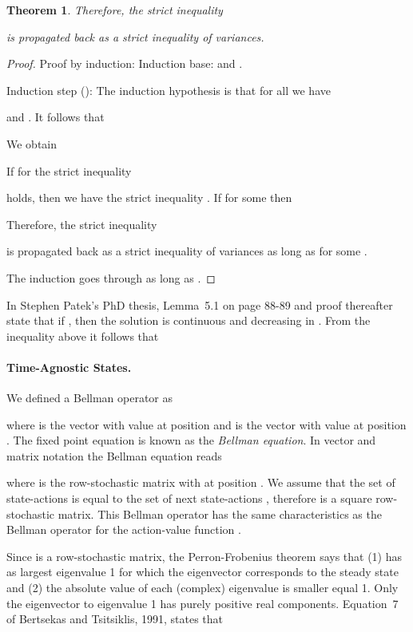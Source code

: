 \documentclass{article}
\newtheorem{theoremA}{Theorem}
\begin{document}
\begin{appendices}
\begin{theoremA}
Therefore, the strict inequality 
 
is propagated back as a strict inequality of variances.
\end{theoremA}

\begin{proof}
Proof by induction:
Induction base:   and
.

Induction step ():
The induction hypothesis is that for all  we have

and  .
It follows that

We obtain

If for  the strict inequality 
 
holds, then we have the strict inequality
.
If  for some   then

Therefore, the strict inequality 
 
is propagated back as a strict inequality of variances
as long as   for some  .

The induction goes through as long as 
.
\end{proof}


In Stephen Patek's PhD thesis, \cite{Patek:97} Lemma~5.1 on page 88-89 and proof
thereafter state that if  , then
the solution  is continuous and decreasing in .
From the inequality above it follows that



\paragraph{Time-Agnostic States.}


We defined a Bellman operator as

where  is the vector with value  at position 
and  is the vector with value
 at position . The fixed point equation is known as
the {\em Bellman equation}. In vector and matrix notation
the Bellman equation reads

where  is the row-stochastic matrix with
 at position .
We assume that the set of state-actions  is equal to the set
of next state-actions , therefore  is a square
row-stochastic matrix.
This Bellman operator has the same characteristics as the Bellman
operator for the action-value function .

Since  is a row-stochastic matrix, the
Perron-Frobenius theorem says
that (1)  has as largest eigenvalue 1 for which
the eigenvector corresponds to the steady state and
(2) the absolute value of each (complex) eigenvalue is smaller equal 1.
Only the eigenvector to eigenvalue 1 has purely positive real components.
Equation~7 of Bertsekas and Tsitsiklis, 1991, \cite{Bertsekas:91}
states that



\end{appendices}
\end{document}
